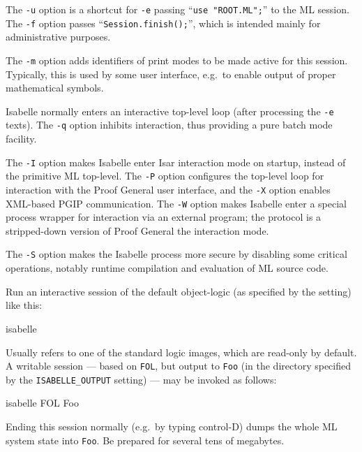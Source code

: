 \begin{isabellebody}
\begin{isamarkuptext}
  \medskip The \verb|-u| option is a shortcut for \verb|-e| passing ``\verb|use "ROOT.ML";|'' to the ML session.
  The \verb|-f| option passes ``\verb|Session.finish();|'', which is intended mainly for administrative
  purposes.

  \medskip The \verb|-m| option adds identifiers of print modes
  to be made active for this session. Typically, this is used by some
  user interface, e.g.\ to enable output of proper mathematical
  symbols.

  \medskip Isabelle normally enters an interactive top-level loop
  (after processing the \verb|-e| texts). The \verb|-q|
  option inhibits interaction, thus providing a pure batch mode
  facility.

  \medskip The \verb|-I| option makes Isabelle enter Isar
  interaction mode on startup, instead of the primitive ML top-level.
  The \verb|-P| option configures the top-level loop for
  interaction with the Proof General user interface, and the
  \verb|-X| option enables XML-based PGIP communication.  The
  \verb|-W| option makes Isabelle enter a special process
  wrapper for interaction via an external program; the protocol is a
  stripped-down version of Proof General the interaction mode.

  \medskip The \verb|-S| option makes the Isabelle process more
  secure by disabling some critical operations, notably runtime
  compilation and evaluation of ML source code.%
\end{isamarkuptext}%
\isamarkuptrue%
%
\isamarkuptrue%
%
\begin{isamarkuptext}%
Run an interactive session of the default object-logic (as specified
  by the \hyperlink{setting.ISABELLE-LOGIC}{\mbox{}} setting) like this:
\begin{ttbox}
isabelle
\end{ttbox}

  Usually \hyperlink{setting.ISABELLE-LOGIC}{\mbox{}} refers to one of the standard
  logic images, which are read-only by default.  A writable session
  --- based on \verb|FOL|, but output to \verb|Foo| (in the
  directory specified by the \verb|ISABELLE_OUTPUT| setting) ---
  may be invoked as follows:
\begin{ttbox}
isabelle FOL Foo
\end{ttbox}
  Ending this session normally (e.g.\ by typing control-D) dumps the
  whole ML system state into \verb|Foo|. Be prepared for several
  tens of megabytes.


\end{isamarkuptext}
\end{isabellebody}

